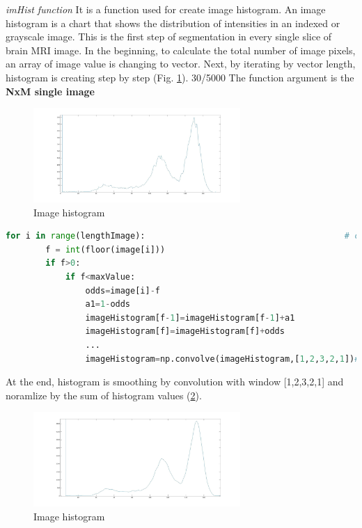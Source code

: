 \textit{imHist function}
It is a function used for create image histogram. An image histogram is a chart that shows the distribution of intensities in an indexed or grayscale image. This is the first step of segmentation in every single slice of brain MRI image. In the beginning, to calculate the total number of image pixels, an array of image value is changing to vector. Next, by iterating by vector length, histogram is creating step by step (Fig. \ref{fig:figures/m09_11}). 
30/5000
The function argument is the \textbf{NxM single image}

\begin{figure}[H]
	\centering{}\includegraphics[width=0.7\textwidth]{figures/Module_09/m09_11}
	\caption{Image histogram  
	\label{fig:figures/m09_11}}
\end{figure} 

\begin{lstlisting}[language=Python, caption = Create image histogram]
    for i in range(lengthImage):										# create histogram of non-zero image values
        f = int(floor(image[i]))										# round floor
        if f>0:
            if f<maxValue:
                odds=image[i]-f             							# difference between image and round floor image value
                a1=1-odds
                imageHistogram[f-1]=imageHistogram[f-1]+a1
                imageHistogram[f]=imageHistogram[f]+odds
                ...
                imageHistogram=np.convolve(imageHistogram,[1,2,3,2,1])# smoothing the histogram
\end{lstlisting}

At the end, histogram is smoothing by convolution with window [1,2,3,2,1] and noramlize by the sum of histogram values (\ref{fig:figures/m09_12}).

\begin{figure}[H]
	\centering{}\includegraphics[width=0.7\textwidth]{figures/Module_09/m09_12}
	\caption{Image histogram  
	\label{fig:figures/m09_12}}
\end{figure} 
\\

